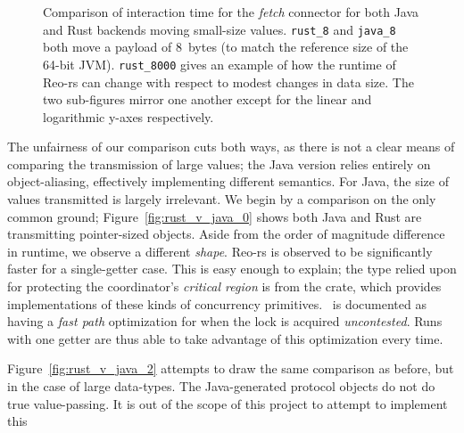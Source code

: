 \begin{figure}
{\begin{subfigure}[b]{0.63\textwidth}
			\caption{}
			\label{fig:rust_v_java_1}
		\end{subfigure}%
	}
	\caption[Java vs.\ Rust interaction time for small values.]{Comparison of interaction time for the \textit{fetch} connector for both Java and Rust backends moving small-size values. \texttt{rust\_8} and \texttt{java\_8}  both move a payload of 8~bytes (to match the reference size of the 64-bit JVM). \texttt{rust\_8000}  gives an example of how the runtime of Reo-rs can change with respect to modest changes in data size. The two sub-figures mirror one another except for the linear and logarithmic y-axes respectively.}
	\label{fig:rust_v_java}
\end{figure}

The unfairness of our comparison cuts both ways, as there is not a clear means of comparing the transmission of large values; the Java version relies entirely on object-aliasing, effectively implementing different semantics. For Java, the size of values transmitted is largely irrelevant. We begin by a comparison on the only common ground; Figure~\ref{fig:rust_v_java_0} shows both Java and Rust are transmitting pointer-sized objects. Aside from the order of magnitude difference in runtime, we observe a different \textit{shape}. Reo-rs is observed to be significantly faster for a single-getter case. This is easy enough to explain; the type relied upon for protecting the coordinator's \textit{critical region} is  from the  crate, which provides implementations of these kinds of concurrency primitives. ~is documented as having a \textit{fast path} optimization for when the lock is acquired \textit{uncontested}. Runs with one getter are thus able to take advantage of this optimization every time.

Figure~\ref{fig:rust_v_java_2} attempts to draw the same comparison as before, but in the case of large data-types. The Java-generated protocol objects do not do true value-passing. It is out of the scope of this project to attempt to implement this

